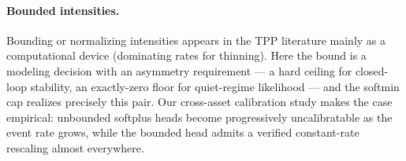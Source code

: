 \paragraph{Bounded intensities.}
Bounding or normalizing intensities appears in the TPP literature mainly as a
computational device (dominating rates for thinning). Here the bound is a modeling
decision with an asymmetry requirement --- a hard ceiling for closed-loop stability,
an exactly-zero floor for quiet-regime likelihood --- and the softmin cap realizes
precisely this pair. Our cross-asset calibration study makes the case empirical:
unbounded softplus heads become progressively uncalibratable as the event rate
grows, while the bounded head admits a verified constant-rate rescaling almost
everywhere.
